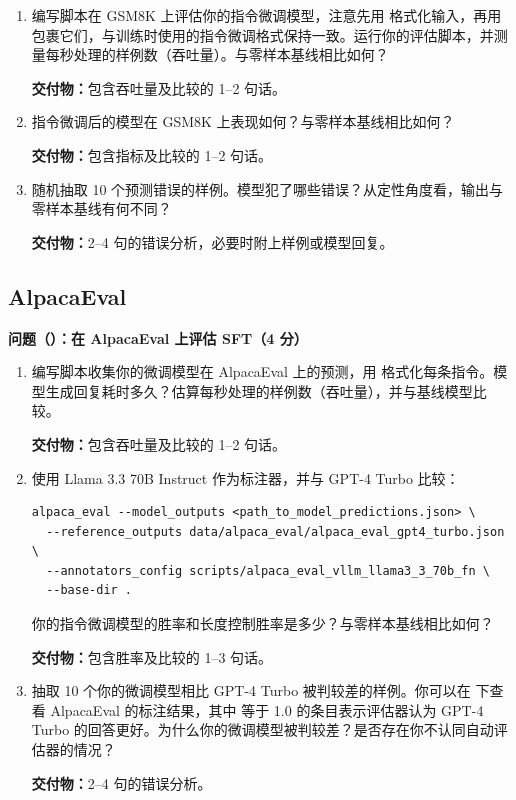 \begin{enumerate}[label=(\alph*)]
  \item 编写脚本在 GSM8K 上评估你的指令微调模型，注意先用  格式化输入，再用  包裹它们，与训练时使用的指令微调格式保持一致。运行你的评估脚本，并测量每秒处理的样例数（吞吐量）。与零样本基线相比如何？

  \textbf{交付物：}包含吞吐量及比较的 1--2 句话。
  \item 指令微调后的模型在 GSM8K 上表现如何？与零样本基线相比如何？

  \textbf{交付物：}包含指标及比较的 1--2 句话。
  \item 随机抽取 10 个预测错误的样例。模型犯了哪些错误？从定性角度看，输出与零样本基线有何不同？

  \textbf{交付物：}2--4 句的错误分析，必要时附上样例或模型回复。
\end{enumerate}

\subsection{AlpacaEval}

\medskip
\noindent\textbf{问题（）：在 AlpacaEval 上评估 SFT（4 分）}
\medskip

\begin{enumerate}[label=(\alph*)]
  \item 编写脚本收集你的微调模型在 AlpacaEval 上的预测，用  格式化每条指令。模型生成回复耗时多久？估算每秒处理的样例数（吞吐量），并与基线模型比较。

  \textbf{交付物：}包含吞吐量及比较的 1--2 句话。
  \item 使用 Llama 3.3 70B Instruct 作为标注器，并与 GPT-4 Turbo 比较：

\begin{lstlisting}
alpaca_eval --model_outputs <path_to_model_predictions.json> \
  --reference_outputs data/alpaca_eval/alpaca_eval_gpt4_turbo.json \
  --annotators_config scripts/alpaca_eval_vllm_llama3_3_70b_fn \
  --base-dir .
\end{lstlisting}

  你的指令微调模型的胜率和长度控制胜率是多少？与零样本基线相比如何？

  \textbf{交付物：}包含胜率及比较的 1--3 句话。
  \item 抽取 10 个你的微调模型相比 GPT-4 Turbo 被判较差的样例。你可以在  下查看 AlpacaEval 的标注结果，其中  等于 1.0 的条目表示评估器认为 GPT-4 Turbo 的回答更好。为什么你的微调模型被判较差？是否存在你不认同自动评估器的情况？

  \textbf{交付物：}2--4 句的错误分析。
\end{enumerate}

